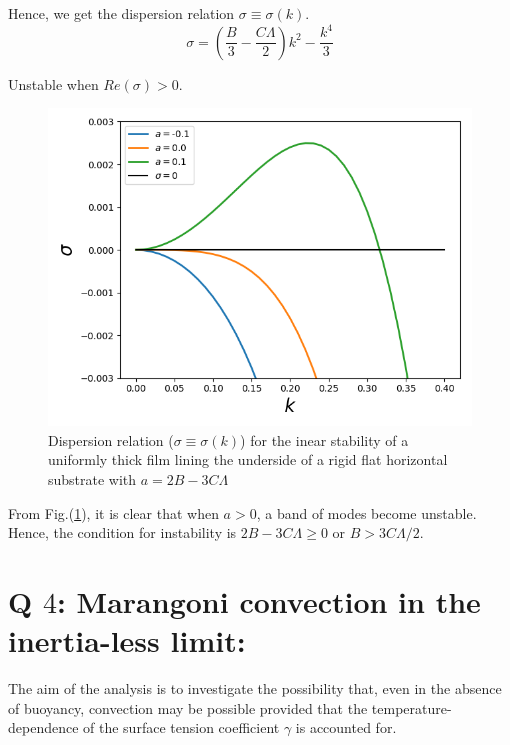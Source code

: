 \documentclass{article}
\begin{document}
Hence, we get the dispersion relation $\sigma \equiv \sigma(k)$. 
\begin{equation}\label{eq:marangoni_dispersion_reln}
 \sigma =  \left(\frac{B}{3} -\frac{C\Lambda}{2}\right) k^{2} - \frac{k^{4}}{3}
\end{equation}

Unstable when $Re(\sigma) > 0$. 

\begin{figure}[H]
    \centering
    \includegraphics[scale = 0.5]{Figs/marangoni_dispersion_reln.png}
    \caption{Dispersion relation ($\sigma \equiv \sigma(k)$) for the inear stability of a uniformly thick film lining the underside of a rigid flat horizontal substrate with $a = 2B - 3C\Lambda$ }
    \label{fig:marangoni_dispersion_reln}
\end{figure}
From Fig.(\ref{fig:marangoni_dispersion_reln}), it is clear that when $a>0$, a band of modes become unstable. Hence, the condition for instability is $2B - 3C\Lambda \geq 0$ or $\boxed{B > 3C\Lambda/2}$.

\section{Q $4$: Marangoni convection in the inertia-less limit: }
The aim of the analysis is to investigate the possibility that, even in the absence of buoyancy, convection may be possible provided that the temperature-dependence of the surface tension coefficient $\gamma$ is accounted for.
\end{document}
